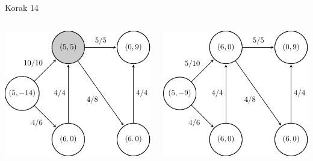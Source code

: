 \documentclass{beamer}
\begin{document}
\begin{frame}{Korak 14}
    \begin{columns}
        \begin{column}{0.5\textwidth}
            \centering
            \includegraphics[scale=0.7]{../writing/images/graf2-15.pdf}
        \end{column}
        \pause
        \begin{column}{0.5\textwidth}
            \centering
            \includegraphics[scale=0.7]{../writing/images/graf2-16.pdf}
        \end{column}
    \end{columns}
\end{frame}
\end{document}
